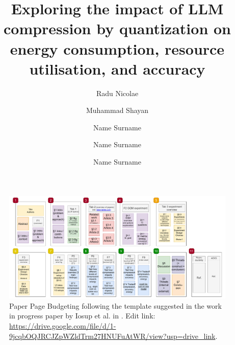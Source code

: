 \documentclass[sigconf,review]{acmart}
\begin{document}
\begin{figure}
    \centering
    \includegraphics[width=0.95\linewidth]{reportTemplate/figures/paper-page-budgeting-green-lab.pdf}
    \caption{Paper Page Budgeting following the template suggested in the work in progress paper by Iosup et al. in \cite{iosup-epema-systems-writing-wip}. Edit link: \url{https://drive.google.com/file/d/1-9jcqbOQJRCJZpWZldTrm27HNUFuAtWR/view?usp=drive_link}.}
    \label{fig:placeholder}
\end{figure}

\newpage

\title{
Exploring the impact of LLM compression by quantization on energy consumption, resource utilisation, and accuracy
}

\author{Radu Nicolae}
 

\author{Muhammad Shayan}
 

\author{Name Surname}
 

\author{Name Surname}
 

\author{Name Surname}
 
\end{document}
